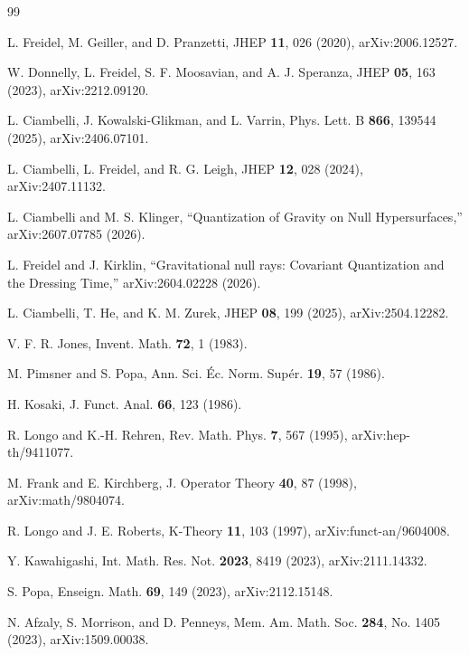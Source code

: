 \documentclass[aps,prd,preprint,nofootinbib,superscriptaddress]{revtex4-2}
\theoremstyle{definition}
\theoremstyle{remark}
\begin{document}
\begin{thebibliography}{99}

L. Freidel, M. Geiller, and D. Pranzetti,
JHEP \textbf{11}, 026 (2020), arXiv:2006.12527.

W. Donnelly, L. Freidel, S. F. Moosavian, and A. J. Speranza,
JHEP \textbf{05}, 163 (2023), arXiv:2212.09120.

L. Ciambelli, J. Kowalski-Glikman, and L. Varrin,
Phys. Lett. B \textbf{866}, 139544 (2025), arXiv:2406.07101.

L. Ciambelli, L. Freidel, and R. G. Leigh,
JHEP \textbf{12}, 028 (2024), arXiv:2407.11132.

L. Ciambelli and M. S. Klinger,
``Quantization of Gravity on Null Hypersurfaces,''
arXiv:2607.07785 (2026).

L. Freidel and J. Kirklin,
``Gravitational null rays: Covariant Quantization and the Dressing Time,''
arXiv:2604.02228 (2026).

L. Ciambelli, T. He, and K. M. Zurek,
JHEP \textbf{08}, 199 (2025), arXiv:2504.12282.

V. F. R. Jones,
Invent. Math. \textbf{72}, 1 (1983).

M. Pimsner and S. Popa,
Ann. Sci. \'{E}c. Norm. Sup\'{e}r. \textbf{19}, 57 (1986).

H. Kosaki,
J. Funct. Anal. \textbf{66}, 123 (1986).

R. Longo and K.-H. Rehren,
Rev. Math. Phys. \textbf{7}, 567 (1995), arXiv:hep-th/9411077.

M. Frank and E. Kirchberg,
J. Operator Theory \textbf{40}, 87 (1998), arXiv:math/9804074.

R. Longo and J. E. Roberts,
K-Theory \textbf{11}, 103 (1997), arXiv:funct-an/9604008.

Y. Kawahigashi,
Int. Math. Res. Not. \textbf{2023}, 8419 (2023), arXiv:2111.14332.

S. Popa,
Enseign. Math. \textbf{69}, 149 (2023), arXiv:2112.15148.

N. Afzaly, S. Morrison, and D. Penneys,
Mem. Am. Math. Soc. \textbf{284}, No. 1405 (2023), arXiv:1509.00038.


\end{thebibliography}
\end{document}
